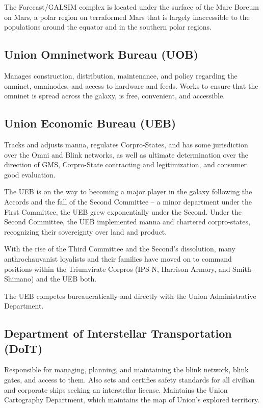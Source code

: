 The Forecast/GALSIM complex is located under the surface of the Mare Boreum on Mars, a
polar region on terraformed Mars that is largely inaccessible to the populations around the
equator and in the southern polar regions.

\subsection{Union Omninetwork Bureau (UOB)}

Manages construction, distribution, maintenance, and policy regarding the omninet, omninodes,
and access to hardware and feeds. Works to ensure that the omninet is spread across the
galaxy, is free, convenient, and accessible.

\subsection{Union Economic Bureau (UEB) }

Tracks and adjusts manna, regulates Corpro-States, and has some jurisdiction over the Omni
and Blink networks, as well as ultimate determination over the direction of GMS, Corpro-State
contracting and legitimization, and consumer good evaluation.

The UEB is on the way to becoming a major player in the galaxy following the Accords and the
fall of the Second Committee -- a minor department under the First Committee, the UEB grew
exponentially under the Second. Under the Second Committee, the UEB implemented manna
and chartered corpro-states, recognizing their sovereignty over land and product.

With the rise of the Third Committee and the Second’s dissolution, many anthrochauvanist
loyalists and their families have moved on to command positions within the Triumvirate Corpros
(IPS-N, Harrison Armory, and Smith-Shimano) and the UEB both.

The UEB competes bureaucratically and directly with the Union Administrative Department.

\subsection{Department of Interstellar Transportation (DoIT)}

Responsible for managing, planning, and maintaining the blink network, blink gates, and access
to them. Also sets and certifies safety standards for all civilian and corporate ships seeking an
interstellar license. Maintains the Union Cartography Department, which maintains the map of
Union’s explored territory.

